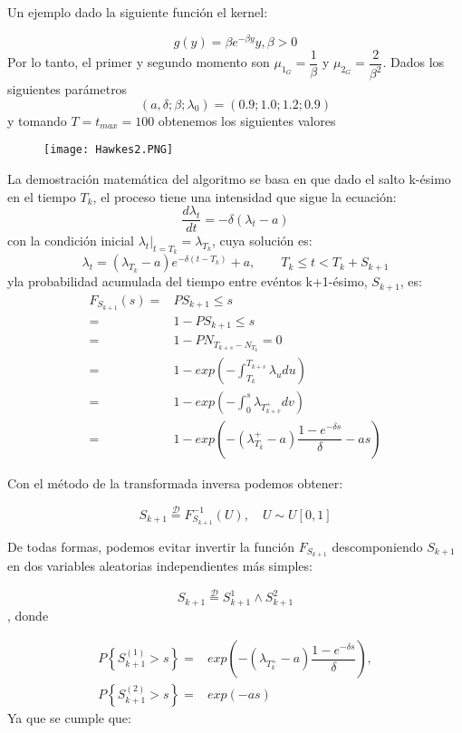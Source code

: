 \documentclass[a4paper,11pt]{book}
\begin{document}
Un ejemplo dado la siguiente función el kernel:

$$g(y)=\beta e^{-\beta y}y,\beta>0$$
Por lo tanto, el primer y segundo momento son $\mu_{1_G}=\dfrac{1}{\beta}$ y $\mu_{2_G}=\dfrac{2}{\beta^2}$. Dados los siguientes parámetros 
$$(a,\delta;\beta;\lambda_0)=(0.9;1.0;1.2;0.9)$$
y tomando $T=t_{max}=100$ obtenemos los siguientes valores
\begin{figure}[H]
\centering
\texttt{[image: Hawkes2.PNG]}    
\end{figure}

La demostración matemática del algoritmo se basa en que dado el salto k-ésimo en el tiempo $T_k$, el proceso tiene una intensidad que sigue la ecuación:
$$\dfrac{d\lambda_t}{dt}=-\delta(\lambda_t-a)$$
con la condición inicial $\lambda_t|_{t=T_k}=\lambda_{T_k}$, cuya solución es:
$$\lambda_t=(\lambda_{T_k}-a)e^{-\delta(t-T_k)}+a,\qquad T_k\leq t< T_k+S_{k+1}$$
yla probabilidad acumulada del tiempo entre evéntos k+1-ésimo, $S_{k+1}$, es:
\begin{align*}
    F_{S_{k+1}}(s)= &P{S_{k+1}\leq s}\\
    =&1-P{S_{k+1}\leq s}\\
    =&1-P{N_{T_{k+s}-N_{T_k}}=0}\\
    =&1-exp \left( -\int_{T_k}^{T_{k+s}} \lambda_u du\right)\\
    =&1-exp \left( -\int_{0}^{s} \lambda_{T_{k+v}^+} dv\right)\\
    =&1-exp \left( -\left( \lambda_{T_k}^+-a \right) \dfrac{1-e^{-\delta s}}{\delta}-as \right)
\end{align*} 

Con el método de la transformada inversa podemos obtener:

$$S_{k+1}\overset{\mathcal{D}}{=}F^{-1}_{S_{k+1}}(U),\quad U\sim U[0,1]$$

De todas formas, podemos evitar invertir la función $F_{S_{k+1}}$ descomponiendo $S_{k+1}$ en dos variables aleatorias independientes más simples:

$$S_{k+1}\overset{\mathcal{D}}{=}S_{k+1}^1\wedge S_{k+1}^2$$,
donde 

\begin{align*}
    P\left\{ S_{k+1}^{(1)}>s \right\} =&exp \left( -\left( \lambda_{T_k^+}-a \right)\dfrac{1-e^{-\delta s}}{\delta} \right), \\
    P\left\{ S_{k+1}^{(2)}>s \right\} =& exp \left( -as \right)
\end{align*}
Ya que se cumple que:
\end{document}
